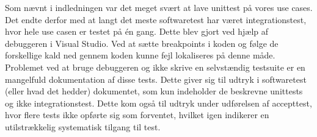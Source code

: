 Som nævnt i indledningen var det meget svært at lave unittest på vores use cases. Det endte derfor med at langt det meste softwaretest har været integrationstest, hvor hele use casen er testet på én gang. Dette blev gjort ved hjælp af debuggeren i Visual Studio. Ved at sætte breakpoints i koden og følge de forskellige kald ned gennem koden kunne fejl lokaliseres på denne måde. Problemet ved at bruge debuggeren og ikke skrive en selvstændig testsuite er en mangelfuld dokumentation af disse tests. Dette giver sig til udtryk i softwaretest (eller hvad det hedder) dokumentet, som kun indeholder de beskrevne unittests og ikke integrationstest. Dette kom også til udtryk under udførelsen af accepttest, hvor flere tests ikke opførte sig som forventet, hvilket igen indikerer en utilstrækkelig systematisk tilgang til test. 
